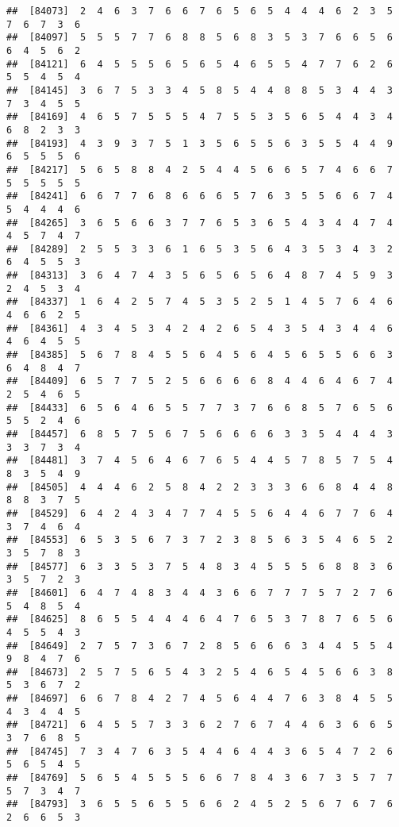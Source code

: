 \documentclass[
]{book}
\begin{document}
\begin{verbatim}
##  [84073]  2  4  6  3  7  6  6  7  6  5  6  5  4  4  4  6  2  3  5  7  6  7  3  6
##  [84097]  5  5  5  7  7  6  8  8  5  6  8  3  5  3  7  6  6  5  6  6  4  5  6  2
##  [84121]  6  4  5  5  5  6  5  6  5  4  6  5  5  4  7  7  6  2  6  5  5  4  5  4
##  [84145]  3  6  7  5  3  3  4  5  8  5  4  4  8  8  5  3  4  4  3  7  3  4  5  5
##  [84169]  4  6  5  7  5  5  5  4  7  5  5  3  5  6  5  4  4  3  4  6  8  2  3  3
##  [84193]  4  3  9  3  7  5  1  3  5  6  5  5  6  3  5  5  4  4  9  6  5  5  5  6
##  [84217]  5  6  5  8  8  4  2  5  4  4  5  6  6  5  7  4  6  6  7  5  5  5  5  5
##  [84241]  6  6  7  7  6  8  6  6  6  5  7  6  3  5  5  6  6  7  4  5  4  4  4  6
##  [84265]  3  6  5  6  6  3  7  7  6  5  3  6  5  4  3  4  4  7  4  4  5  7  4  7
##  [84289]  2  5  5  3  3  6  1  6  5  3  5  6  4  3  5  3  4  3  2  6  4  5  5  3
##  [84313]  3  6  4  7  4  3  5  6  5  6  5  6  4  8  7  4  5  9  3  2  4  5  3  4
##  [84337]  1  6  4  2  5  7  4  5  3  5  2  5  1  4  5  7  6  4  6  4  6  6  2  5
##  [84361]  4  3  4  5  3  4  2  4  2  6  5  4  3  5  4  3  4  4  6  4  6  4  5  5
##  [84385]  5  6  7  8  4  5  5  6  4  5  6  4  5  6  5  5  6  6  3  6  4  8  4  7
##  [84409]  6  5  7  7  5  2  5  6  6  6  6  8  4  4  6  4  6  7  4  2  5  4  6  5
##  [84433]  6  5  6  4  6  5  5  7  7  3  7  6  6  8  5  7  6  5  6  5  5  2  4  6
##  [84457]  6  8  5  7  5  6  7  5  6  6  6  6  3  3  5  4  4  4  3  3  3  7  3  4
##  [84481]  3  7  4  5  6  4  6  7  6  5  4  4  5  7  8  5  7  5  4  8  3  5  4  9
##  [84505]  4  4  4  6  2  5  8  4  2  2  3  3  3  6  6  8  4  4  8  8  8  3  7  5
##  [84529]  6  4  2  4  3  4  7  7  4  5  5  6  4  4  6  7  7  6  4  3  7  4  6  4
##  [84553]  6  5  3  5  6  7  3  7  2  3  8  5  6  3  5  4  6  5  2  3  5  7  8  3
##  [84577]  6  3  3  5  3  7  5  4  8  3  4  5  5  5  6  8  8  3  6  3  5  7  2  3
##  [84601]  6  4  7  4  8  3  4  4  3  6  6  7  7  7  5  7  2  7  6  5  4  8  5  4
##  [84625]  8  6  5  5  4  4  4  6  4  7  6  5  3  7  8  7  6  5  6  4  5  5  4  3
##  [84649]  2  7  5  7  3  6  7  2  8  5  6  6  6  3  4  4  5  5  4  9  8  4  7  6
##  [84673]  2  5  7  5  6  5  4  3  2  5  4  6  5  4  5  6  6  3  8  5  3  6  7  2
##  [84697]  6  6  7  8  4  2  7  4  5  6  4  4  7  6  3  8  4  5  5  4  3  4  4  5
##  [84721]  6  4  5  5  7  3  3  6  2  7  6  7  4  4  6  3  6  6  5  3  7  6  8  5
##  [84745]  7  3  4  7  6  3  5  4  4  6  4  4  3  6  5  4  7  2  6  5  6  5  4  5
##  [84769]  5  6  5  4  5  5  5  6  6  7  8  4  3  6  7  3  5  7  7  5  7  3  4  7
##  [84793]  3  6  5  5  6  5  5  6  6  2  4  5  2  5  6  7  6  7  6  2  6  6  5  3

\end{verbatim}
\end{document}
